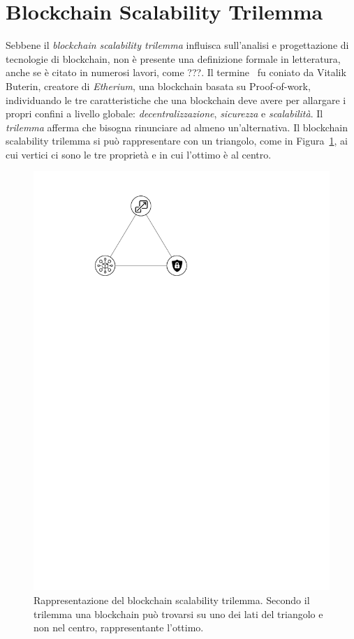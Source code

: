 \section{Blockchain Scalability Trilemma}
Sebbene il \emph{blockchain scalability trilemma} influisca sull'analisi e progettazione di tecnologie di blockchain, non è presente una definizione formale in letteratura, anche se è citato in numerosi lavori, come ???. Il termine~\cite{ethfaqsharding} fu coniato da Vitalik Buterin, creatore di \emph{Etherium}, una blockchain basata su Proof-of-work, individuando le tre caratteristiche che una blockchain deve avere per allargare i propri confini a livello globale: \emph{decentralizzazione}, \emph{sicurezza} e \emph{scalabilità}. Il \emph{trilemma} afferma che bisogna rinunciare ad almeno un'alternativa. Il blockchain scalability trilemma si può rappresentare con un triangolo, come in Figura~\ref{fig:trilemma}, ai cui vertici ci sono le tre proprietà e in cui l'ottimo è al centro.

\begin{figure}
	\centering
	\includegraphics{img/capuno/trilemma.pdf}
	\caption{Rappresentazione del blockchain scalability trilemma. Secondo il trilemma una blockchain può trovarsi su uno dei lati del triangolo e non nel centro, rappresentante l'ottimo.}
	\label{fig:trilemma}
\end{figure}

